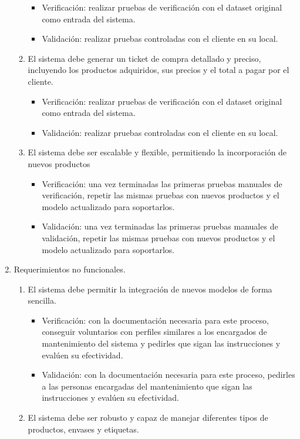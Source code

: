 \documentclass[
11pt, %
]{charter}
\begin{document}
\begin{enumerate}
\begin{enumerate}
			\begin{itemize}
	\item Verificación: realizar pruebas de verificación con el dataset original como entrada del sistema.  
	\item Validación: realizar pruebas controladas con el cliente en su local.  
\end{itemize}
			\item El sistema debe generar un ticket de compra detallado y preciso, incluyendo los productos adquiridos, sus precios y el total a pagar por el cliente.
			\begin{itemize}
	\item Verificación: realizar pruebas de verificación con el dataset original como entrada del sistema.  
	\item Validación: realizar pruebas controladas con el cliente en su local.  
\end{itemize}
			\item El sistema debe ser escalable y flexible, permitiendo la incorporación de nuevos productos
			\begin{itemize}
	\item Verificación: una vez terminadas las primeras pruebas manuales de verificación, repetir las mismas pruebas con nuevos productos y el modelo actualizado para soportarlos.
	\item Validación: una vez terminadas las primeras pruebas manuales de validación, repetir las mismas pruebas con nuevos productos y el modelo actualizado para soportarlos.  
\end{itemize}
\end{enumerate}
\item Requerimientos no funcionales.
\begin{enumerate}
\item El sistema debe permitir la integración de nuevos modelos de forma sencilla.
		\begin{itemize}
	\item Verificación: con la documentación necesaria para este proceso, conseguir voluntarios con perfiles similares a los encargados de mantenimiento del sistema y pedirles que sigan las instrucciones y evalúen su efectividad. 
	\item Validación: con la documentación necesaria para este proceso, pedirles a las personas encargadas del mantenimiento que sigan las instrucciones y evalúen su efectividad.
\end{itemize}
			\item El sistema debe ser robusto y capaz de manejar diferentes tipos de productos, envases y etiquetas.	

\end{enumerate}
\end{enumerate}
\end{document}
